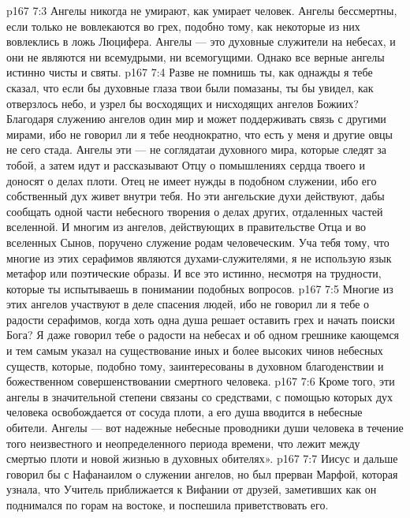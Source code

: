 \vs p167 7:3 Ангелы никогда не умирают, как умирает человек. Ангелы бессмертны, если только не вовлекаются во грех, подобно тому, как некоторые из них вовлеклись в ложь Люцифера. Ангелы --- это духовные служители на небесах, и они не являются ни всемудрыми, ни всемогущими. Однако все верные ангелы истинно чисты и святы.
\vs p167 7:4 Разве не помнишь ты, как однажды я тебе сказал, что если бы духовные глаза твои были помазаны, ты бы увидел, как отверзлось небо, и узрел бы восходящих и нисходящих ангелов Божиих? Благодаря служению ангелов один мир и может поддерживать связь с другими мирами, ибо не говорил ли я тебе неоднократно, что есть у меня и другие овцы не сего стада. Ангелы эти --- не соглядатаи духовного мира, которые следят за тобой, а затем идут и рассказывают Отцу о помышлениях сердца твоего и доносят о делах плоти. Отец не имеет нужды в подобном служении, ибо его собственный дух живет внутри тебя. Но эти ангельские духи действуют, дабы сообщать одной части небесного творения о делах других, отдаленных частей вселенной. И многим из ангелов, действующих в правительстве Отца и во вселенных Сынов, поручено служение родам человеческим. Уча тебя тому, что многие из этих серафимов являются духами\hyp{}служителями, я не использую язык метафор или поэтические образы. И все это истинно, несмотря на трудности, которые ты испытываешь в понимании подобных вопросов.
\vs p167 7:5 Многие из этих ангелов участвуют в деле спасения людей, ибо не говорил ли я тебе о радости серафимов, когда хоть одна душа решает оставить грех и начать поиски Бога? Я даже говорил тебе о радости  на небесах и об одном грешнике кающемся и тем самым указал на существование иных и более высоких чинов небесных существ, которые, подобно тому, заинтересованы в духовном благоденствии и божественном совершенствовании смертного человека.
\vs p167 7:6 Кроме того, эти ангелы в значительной степени связаны со средствами, с помощью которых дух человека освобождается от сосуда плоти, а его душа вводится в небесные обители. Ангелы --- вот надежные небесные проводники души человека в течение того неизвестного и неопределенного периода времени, что лежит между смертью плоти и новой жизнью в духовных обителях».
\vs p167 7:7 \pc Иисус и дальше говорил бы с Нафанаилом о служении ангелов, но был прерван Марфой, которая узнала, что Учитель приближается к Вифании от друзей, заметивших как он поднимался по горам на востоке, и поспешила приветствовать его.

